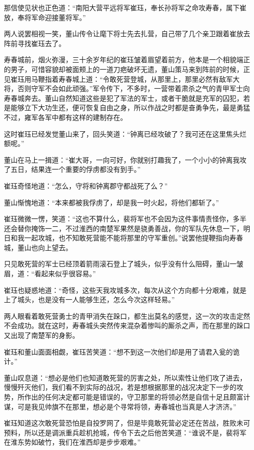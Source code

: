 那信使见状也正色道：“南阳大营平远将军崔珏，奉长孙将军之命攻寿春，属下崔放，奉将军命迎接董将军。”

两人说罢相视一笑，董山传令让麾下将士先去扎营，自己带了几个亲卫跟着崔放去阵前寻找崔珏去了。

寿春城前，烟火弥漫，三十余岁年纪的崔珏皱着眉望着前方，他本是一个相貌端正的男子，可惜容貌却被面颊上的一道刀疤破坏无遗，董山策马来到阵前的时候，正见崔珏用马鞭指着寿春城上道：“令敢死营登城，从那里上，那里必然有敌军大将，否则守军不会如此顽强。”军令传下，不多时，一营带着肃杀之气的青甲军士向寿春城奔去。董山自然知道这些是犯了军法的军士，或者干脆就是充军的囚犯，若是能够立下大功生还，便可恢复自由之身，所以作战之时都是奋勇争先，最是勇猛不过，雍军各军中都有这样的建制存在。

这时崔珏已经发觉董山来了，回头笑道：“钟离已经攻破了？我可还在这里焦头烂额呢。”

董山在马上一揖道：“崔大哥，一向可好，你就别打趣我了，一个小小的钟离我攻了五日，结果连一个重要的俘虏都没有到手。”

崔珏奇怪地道：“怎么，守将和钟离郡守都战死了么？”

董山惭愧地道：“本来都被我俘虏了，却是我一时火起，将他们都斩了。”

崔珏微微一愣，笑道：“这也不算什么，裴将军也不会因为这件事情责怪你，多半还会替你掩饰一二，不过淮西的南楚军果然是骁勇善战，你的军队先休息一下，明日和我一起攻城，也不知敢死营能不能将那里的守军重创。”说罢他提鞭指向寿春城，董山也向上望去。

只见敢死营的军士已经顶着箭雨滚石登上了城头，似乎没有什么阻碍，董山一皱眉，道：“看起来似乎很容易。”

崔珏也疑惑地道：“奇怪，这些天我攻城多次，每次从这个方向都十分艰难，就是上了城头，也是没有一人能够生还，怎么今次这样轻易。”

两人眼看着敢死营勇士的青甲消失在跺口，都生出莫名的感觉，这一次的攻击定然不会成功。就在这时，寿春城头突然传来混杂着惨叫的厮杀之声，而在那里的跺口又出现了南楚军的身影。

崔珏和董山面面相觑，崔珏苦笑道：“想不到这一次他们却是用了请君入瓮的诡计。”

董山叹息道：“想必是他们也知道敢死营的厉害之处，所以索性让他们攻了进去，慢慢歼灭他们，我们看不到实际的战况，若是想根据那里的战况决定下一步的攻势，所作出的任何决定都可能是错误的，守卫那里的将领必然是自信十足且颇富计谋，可是我见帅旗不在那里，想必是个寻常将领，寿春城也当真是人才济济。”

崔珏知道这次敢死营恐怕是自投罗网了，但是毕竟敢死营必定还在苦战，胜败未可预料，所以还是调派重兵趁机抢城，传令下去之后他苦笑道：“谁说不是，裴将军在淮东势如破竹，我们在淮西却是步步艰难。”

